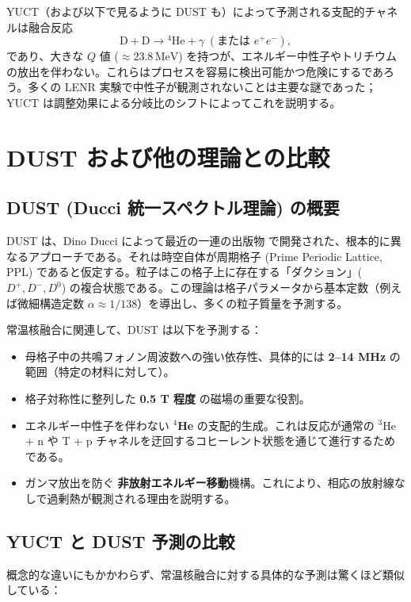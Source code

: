 \documentclass[12pt]{article}
\theoremstyle{remark}
\begin{document}
	YUCT（および以下で見るように DUST も）によって予測される支配的チャネルは融合反応
	\[
	\mathrm{D} + \mathrm{D} \to {}^4\mathrm{He} + \gamma\;(\text{または } e^+e^-),
	\]
	であり、大きな \(Q\) 値 (\(\approx 23.8\,\text{MeV}\)) を持つが、エネルギー中性子やトリチウムの放出を伴わない。これらはプロセスを容易に検出可能かつ危険にするであろう。多くの LENR 実験で中性子が観測されないことは主要な謎であった；YUCT は調整効果による分岐比のシフトによってこれを説明する。
	
	\section{DUST および他の理論との比較}
	\label{sec:comparison}
	
	\subsection{DUST (Ducci 統一スペクトル理論) の概要}
	
	DUST は、Dino Ducci によって最近の一連の出版物 \cite{Ducci2025,Ducci2026a,Ducci2026b} で開発された、根本的に異なるアプローチである。それは時空自体が周期格子 (Prime Periodic Lattice, PPL) であると仮定する。粒子はこの格子上に存在する「ダクション」(\(D^+, D^-, D^0\)) の複合状態である。この理論は格子パラメータから基本定数（例えば微細構造定数 \(\alpha \approx 1/138\)）を導出し、多くの粒子質量を予測する。
	
	常温核融合に関連して、DUST は以下を予測する：
	\begin{itemize}
		\item 母格子中の共鳴フォノン周波数への強い依存性、具体的には \textbf{2–14 MHz} の範囲（特定の材料に対して）。
		\item 格子対称性に整列した \textbf{0.5 T 程度} の磁場の重要な役割。
		\item エネルギー中性子を伴わない \textbf{\(^4\)He} の支配的生成。これは反応が通常の \(^3\)He + n や T + p チャネルを迂回するコヒーレント状態を通じて進行するためである。
		\item ガンマ放出を防ぐ \textbf{非放射エネルギー移動}機構。これにより、相応の放射線なしで過剰熱が観測される理由を説明する。
	\end{itemize}
	
	\subsection{YUCT と DUST 予測の比較}
	
	概念的な違いにもかかわらず、常温核融合に対する具体的な予測は驚くほど類似している：
	
\end{document}
